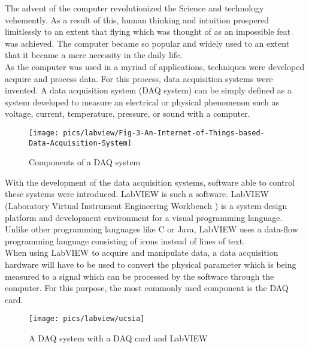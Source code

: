 The advent of the computer revolutionized the Science and technology vehemently. As a result of this, human thinking and intuition prospered limitlessly to an extent that flying which was thought of as an impossible feat was achieved. The computer became so popular and widely used to an extent that it became a mere necessity in the daily life.  \\

\noindent
As the computer was used in a myriad of applications, techniques  were developed acquire and process data. For this process, data acquisition systems were invented. A data acquisition system (DAQ system) can be simply defined as a system developed to measure an electrical or physical phenomenon such as voltage, current, temperature, pressure, or sound with a computer.\\

\begin{figure}[!h]
	\centering
	\texttt{[image: pics/labview/Fig-3-An-Internet-of-Things-based-Data-Acquisition-System]}
	\caption{Components of a DAQ system}
	\label{fig:fig-3-an-internet-of-things-based-data-acquisition-system}
\end{figure}


\noindent
With the development of the data acquisition systems, software able to control these systems were introduced. LabVIEW is such a software. LabVIEW (Laboratory Virtual Instrument Engineering Workbench ) is a system-design platform and development environment for a visual programming language. Unlike other programming languages like C or Java, LabVIEW uses a data-flow programming language consisting of icons instead of lines of text.\\

\noindent
When using LabVIEW to acquire and manipulate data, a data acquisition hardware will have to be used to convert the physical parameter which is being measured to a signal which can be processed by the software through the computer. For this purpose, the most commonly used component is the DAQ card. 
\begin{figure}[!ht]
	\centering
	\texttt{[image: pics/labview/ucsia]}
	\caption{A DAQ system with a DAQ card and LabVIEW}
	\label{fig:ucsia}
\end{figure}


\noindent


